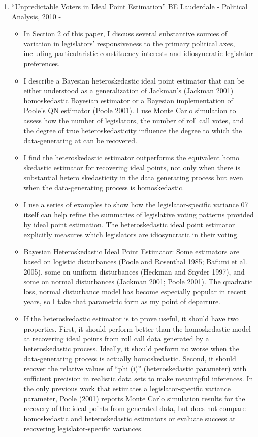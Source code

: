 \documentclass[a4paper,12pt]{article}
\begin{document}
\begin{enumerate}
\item “Unpredictable Voters in Ideal Point Estimation” BE Lauderdale - Political Analysis, 2010 -  
\begin{itemize}
\item In Section 2 of this paper, I discuss several substantive sources of variation in legislators' responsiveness to the primary political axes, including particularistic constituency interests and idiosyncratic legislator preferences. 
\item I describe a Bayesian heteroskedastic ideal point estimator that can be either understood as a generalization of Jackman's (Jackman 2001) homoskedastic Bayesian estimator or a Bayesian implementation of Poole's QN estimator (Poole 2001). I use Monte Carlo simulation to assess how the number of legislators, the number of roll call votes, and the degree of true heteroskedasticity influence the degree to which the data-generating at can be recovered. 
\item I find the heteroskedastic estimator outperforms the equivalent homo skedastic estimator for recovering ideal points, not only when there is substantial hetero skedasticity in the data generating process but even when the data-generating process is homoskedastic.
\item I use a series of examples to show how the legislator-specific variance 07 itself can help refine the summaries of legislative voting patterns provided by ideal point estimation. The heteroskedastic ideal point estimator explicitly measures which legislators are idiosyncratic in their voting. 
\item Bayesian Heteroskedastic Ideal Point Estimator: Some estimators are based on logistic disturbances (Poole and Rosenthal 1985; Bafumi et al. 2005), some on uniform disturbances (Heckman and Snyder 1997), and some on normal disturbances (Jackman 2001; Poole 2001). The quadratic loss, normal disturbance model has become especially popular in recent years, so I take that parametric form as my point of departure. 
\item If the heteroskedastic estimator is to prove useful, it should have two properties. First, it should perform better than the homoskedastic model at recovering ideal points from roll call data generated by a heteroskedastic process. Ideally, it should perform no worse when the data-generating process is actually homoskedastic. Second, it should recover the relative values of “phi (i)” (heteroskedastic parameter) with sufficient precision in realistic data sets to make meaningful inferences. In the only previous work that estimates a legislator-specific variance parameter, Poole (2001) reports Monte Carlo simulation results for the recovery of the ideal points from generated data, but does not compare homoskedastic and heteroskedastic estimators or evaluate success at recovering legislator-specific variances.

\end{itemize}
\end{enumerate}
\end{document}
